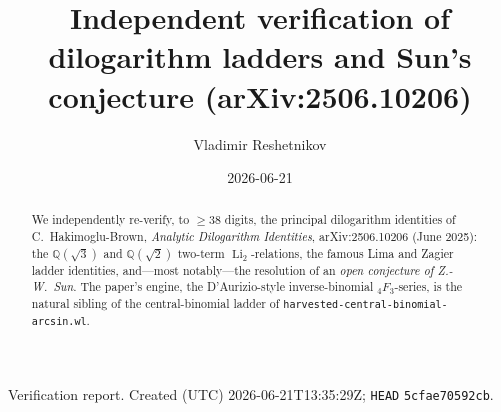 \documentclass[11pt]{article}
\title{Independent verification of dilogarithm ladders and Sun's conjecture (arXiv:2506.10206)}
\author{Vladimir Reshetnikov}\date{2026-06-21}
\DeclareMathOperator{\Li}{Li}
\newcommand{\code}[1]{\texttt{\small #1}}
\begin{document}
\maketitle
\begin{center}\small Verification report. Created (UTC) 2026-06-21T13:35:29Z; \texttt{HEAD} \texttt{5cfae70592cb}.\end{center}

\begin{abstract}
We independently re-verify, to $\ge38$ digits, the principal dilogarithm identities of C.~Hakimoglu-Brown,
\emph{Analytic Dilogarithm Identities}, arXiv:2506.10206 (June 2025): the $\mathbb{Q}(\sqrt3)$ and
$\mathbb{Q}(\sqrt2)$ two-term $\Li_2$-relations, the famous Lima and Zagier ladder identities, and---most
notably---the resolution of an \emph{open conjecture of Z.-W.\ Sun}. The paper's engine, the
D'Aurizio-style inverse-binomial $_4F_3$-series, is the natural sibling of the central-binomial ladder
of \code{harvested-central-binomial-arcsin.wl}.
\end{abstract}
\end{document}
